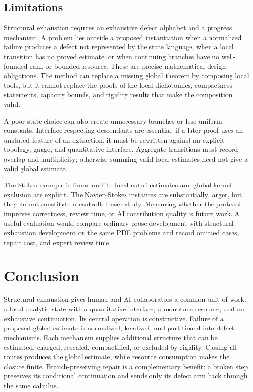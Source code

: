 \documentclass[11pt,reqno]{amsart}
\theoremstyle{plain}
\theoremstyle{definition}
\theoremstyle{remark}
\numberwithin{equation}{section}
\begin{document}
\subsection{Limitations}

Structural exhaustion requires an exhaustive defect alphabet and a progress
mechanism.  A problem lies outside a proposed instantiation when a normalized
failure produces a defect not represented by the state language, when a local
transition has no proved estimate, or when continuing branches have no
well-founded rank or bounded resource.  These are precise mathematical design
obligations.  The method can replace a missing global theorem by composing
local tools, but it cannot replace the proofs of the local dichotomies,
compactness statements, capacity bounds, and rigidity results that make the
composition valid.

A poor state choice can also create unnecessary branches or lose uniform
constants.  Interface-respecting descendants are essential: if a later proof
uses an unstated feature of an extraction, it must be rewritten against an
explicit topology, gauge, and quantitative interface.  Aggregate transitions
must record overlap and multiplicity; otherwise summing valid local estimates
need not give a valid global estimate.

The Stokes example is linear and its local cutoff estimates and global kernel
exclusion are explicit.
The Navier--Stokes instances are substantially larger, but they do not constitute a
controlled user study.  Measuring whether the protocol improves correctness,
review time, or AI contribution quality is future work.  A useful evaluation
would compare ordinary prose development with structural-exhaustion development on
the same PDE problems and record omitted cases, repair cost, and expert review
time.

\section{Conclusion}

Structural exhaustion gives human and AI collaborators a common unit of work:
a local analytic state with a quantitative interface, a monotone resource, and
an exhaustive continuation.  Its central operation is constructive.  Failure
of a proposed global estimate is normalized, localized, and partitioned into
defect mechanisms.  Each mechanism supplies additional structure that can be
estimated, charged, rescaled, compactified, or excluded by rigidity.  Closing
all routes produces the global estimate, while resource consumption makes the
closure finite.  Branch-preserving repair is a complementary benefit: a broken
step preserves its conditional continuation and sends only its defect arm back
through the same calculus.
\end{document}
